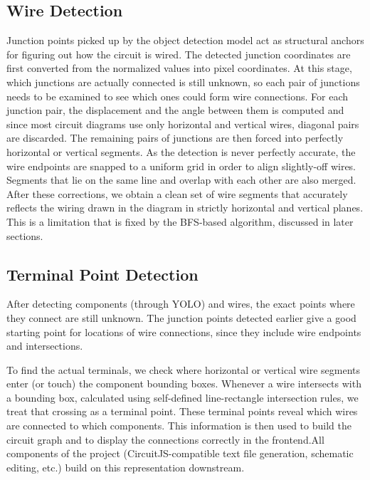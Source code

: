 \subsection{Wire Detection}

Junction points picked up by the object detection model act as structural anchors for figuring out how the circuit is wired. The detected junction coordinates are first converted from the normalized values into pixel coordinates. At this stage, which junctions are actually connected is still unknown, so each pair of junctions needs to be examined to see which ones could form wire connections. For each junction pair, the displacement and the angle between them is computed and since most circuit diagrams use only horizontal and vertical wires, diagonal pairs are discarded. The remaining pairs of junctions are then forced into perfectly horizontal or vertical segments. As the detection is never perfectly accurate, the wire endpoints are snapped to a uniform grid in order to align slightly-off wires. Segments that lie on the same line and overlap with each other are also merged. After these corrections, we obtain a clean set of wire segments that accurately reflects the wiring drawn in the diagram in strictly horizontal and vertical planes. This is a limitation that is fixed by the BFS-based algorithm, discussed in later sections. 

\subsection{Terminal Point Detection}

After detecting components (through YOLO) and wires, the exact points where they connect are still unknown. The junction points detected earlier give a good starting point for locations of wire connections, since they include wire endpoints and intersections.

To find the actual terminals, we check where horizontal or vertical wire segments enter (or touch) the component bounding boxes. Whenever a wire intersects with a bounding box, calculated using self-defined line-rectangle intersection rules, we treat that crossing as a terminal point. These terminal points reveal which wires are connected to which components. This information is then used to build the circuit graph and to display the connections correctly in the frontend.All components of the project (CircuitJS-compatible text file generation, schematic editing, etc.) build on this representation downstream.

